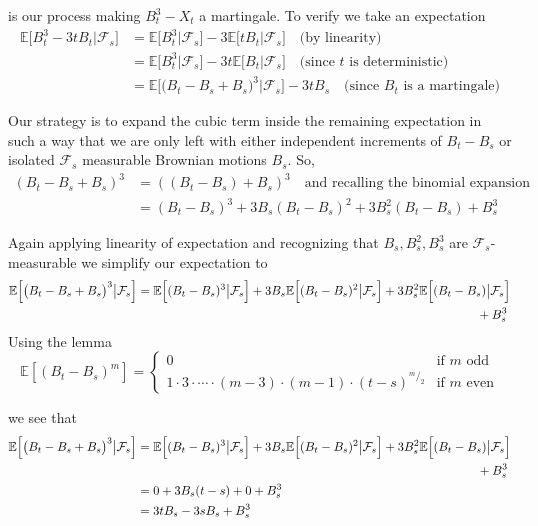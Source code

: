 \documentclass[12pt]{article}
\newlength\tindent
\renewcommand{\indent}{\hspace*{\tindent}}
\begin{document}
is our process making $B_t^3 - X_t$ a martingale. To verify we take an expectation
\begin{align*}
	\mathbb E\Big[B_t^3 - 3tB_t \big|\mathcal F_s\Big] &= \mathbb E\Big[B_t^3 \big|\mathcal F_s\Big] - 3\mathbb E\Big[tB_t \big|\mathcal F_s \Big] \quad \text{(by linearity)} \\
	&= \mathbb E\Big[B_t^3 \big|\mathcal F_s\Big] - 3t\mathbb E\Big[B_t \big|\mathcal F_s \Big] \quad \text{(since $t$ is deterministic)} \\
	&= \mathbb E\Big[\big(B_t - B_s + B_s\big)^3 \big|\mathcal F_s\Big] -3tB_s \quad \text{(since $B_t$ is a martingale)}
\end{align*}

\indent Our strategy is to expand the cubic term inside the remaining expectation in such a way that we are only left with either independent increments of $B_t - B_s$ or isolated $\mathcal F_s$ measurable Brownian motions $B_s$. So,
\begin{align*}
	(B_t - B_s + B_s)^3 &= ((B_t - B_s) + B_s)^3 \quad \text{and recalling the binomial expansion}\\
	&= (B_t - B_s)^3 + 3B_s(B_t - B_s)^2 + 3B_s^2(B_t - B_s) + B_s^3
\end{align*}

\indent Again applying linearity of expectation and recognizing that $B_s, B^2_s, B^3_s$ are $\mathcal F_s$-measurable we simplify our expectation to 
\begin{align*}
	\mathbb E\Big[\big(B_t - B_s + B_s\big)^3 \big|\mathcal F_s\Big] &= \mathbb E\Big[(B_t - B_s)^3\big|\mathcal F_s\Big] + 3B_s\mathbb E\Big[(B_t - B_s)^2\big|\mathcal F_s\Big] + 3B_s^2\mathbb E\Big[(B_t - B_s)\big|\mathcal F_s\Big] \\
	&\hphantom{{}={\mathbb E\Big[(B_t - B_s)^3\big|\mathcal F_s\Big] + 3\mathbb E\Big[B_s(B_t - B_s)^2\big|\mathcal F_s\Big] + 3\mathbb E\Big[B_s^2(B_t - B}} + B_s^3
\end{align*}
Using the lemma
\begin{equation*}
	\mathbb E[(B_t - B_s)^m] =
		\begin{cases}
			0 & \text{if $m$ odd} \\
			1 \cdot 3 \cdot \cdots \cdot (m-3)\cdot (m-1)\cdot(t-s)^{^m/_2} &\text{if $m$ even}
		\end{cases}
\end{equation*}

we see that 
\begin{align*}
	\mathbb E\Big[\big(B_t - B_s + B_s\big)^3 \big|\mathcal F_s\Big] &=
	\mathbb E\Big[(B_t - B_s)^3\big|\mathcal F_s\Big] + 3B_s\mathbb E\Big[(B_t - B_s)^2\big|\mathcal F_s\Big] + 3B_s^2\mathbb E\Big[(B_t - B_s)\big|\mathcal F_s\Big] \\
	&\hphantom{{}={\mathbb E\Big[(B_t - B_s)^3\big|\mathcal F_s\Big] + 3\mathbb E\Big[B_s(B_t - B_s)^2\big|\mathcal F_s\Big] + 3\mathbb E\Big[B_s^2(B_t - B}} + B_s^3\\
	&= 0 + 3B_s(t - s) + 0 + B^3_s \\
	&= 3tB_s - 3sB_s + B^3_s
\end{align*}
\end{document}
